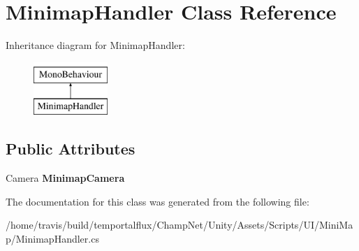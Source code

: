 \hypertarget{class_minimap_handler}{\section{Minimap\-Handler Class Reference}
\label{class_minimap_handler}
}
Inheritance diagram for Minimap\-Handler\-:\begin{figure}[H]
\begin{center}
\leavevmode
\includegraphics[height=2.000000cm]{class_minimap_handler}
\end{center}
\end{figure}
\subsection*{Public Attributes}
\begin{DoxyCompactItemize}
\item 
\hypertarget{class_minimap_handler_a29ccc8d8bee56eaf345fbcdddb369166}{Camera {\bfseries Minimap\-Camera}}\label{class_minimap_handler_a29ccc8d8bee56eaf345fbcdddb369166}

\end{DoxyCompactItemize}


The documentation for this class was generated from the following file\-:\begin{DoxyCompactItemize}
\item 
/home/travis/build/temportalflux/\-Champ\-Net/\-Unity/\-Assets/\-Scripts/\-U\-I/\-Mini\-Map/Minimap\-Handler.\-cs\end{DoxyCompactItemize}
